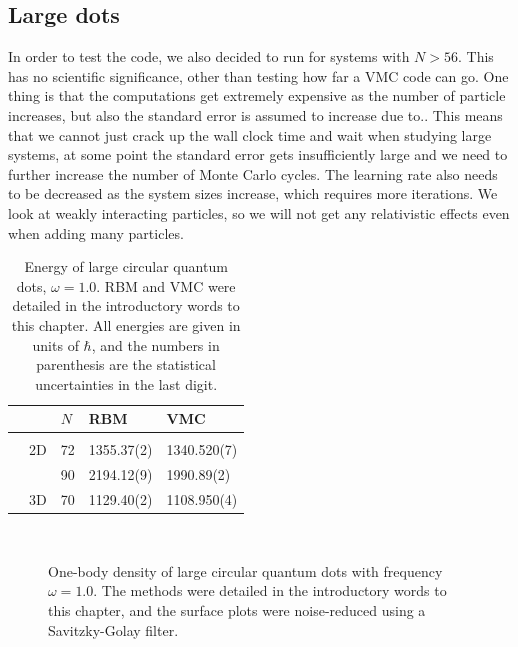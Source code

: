 \subsection{Large dots}
In order to test the code, we also decided to run for systems with $N>56$. This has no scientific significance, other than testing how far a VMC code can go. One thing is that the computations get extremely expensive as the number of particle increases, but also the standard error is assumed to increase due to.. This means that we cannot just crack up the wall clock time and wait when studying large systems, at some point the standard error gets insufficiently large and we need to further increase the number of Monte Carlo cycles. The learning rate also needs to be decreased as the system sizes increase, which requires more iterations.  We look at weakly interacting particles, so we will not get any relativistic effects even when adding many particles.

\begin{table}[H]
	\caption{Energy of large circular quantum dots, $\omega=1.0$. RBM and VMC were detailed in the introductory words to this chapter. All energies are given in units of $\hbar$, and the numbers in parenthesis are the statistical uncertainties in the last digit.}
	\label{tab:largeQD}
	\begin{tabularx}{\textwidth}{R{1.6cm}R{2cm}R{2cm}R{3cm}R{3cm}} \hline\hline
		& \makecell{\\ \phantom{$N$} \\ \phantom{=}} & $N$ & RBM & VMC \\ \hline \\
		& 2D & 72 & 1355.37(2) & 1340.520(7) \\
		&& 90 & 2194.12(9) & 1990.89(2) \\
		& 3D & 70 & 1129.40(2) & 1108.950(4) \\
		\hline \hline
	\end{tabularx}
\end{table}

\begin{figure}[H]
	\centering
	\captionsetup[subfigure]{labelformat=empty}
	\\
	\caption{One-body density of large circular quantum dots with frequency $\omega=1.0$. The methods were detailed in the introductory words to this chapter, and the surface plots were noise-reduced using a Savitzky-Golay filter.}
	\label{fig:largedotsOB}
\end{figure}

